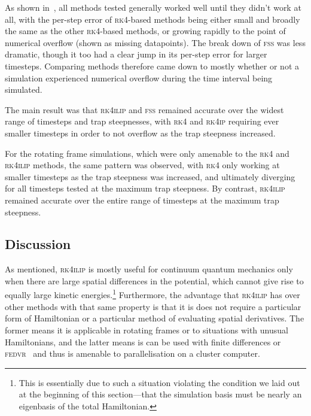 As shown in~, all methods tested generally worked well until they didn't work at all, with the per-step error of \textsc{rk4}-based methods being either small and broadly the same as the other \textsc{rk4}-based methods, or growing rapidly to the point of numerical overflow (shown as missing datapoints). The break down of \textsc{fss} was less dramatic, though it too had a clear jump in its per-step error for larger timesteps. Comparing methods therefore came down to mostly whether or not a simulation experienced numerical overflow during the time interval being simulated.

The main result was that \textsc{rk4ilip} and \textsc{fss} remained accurate over the widest range of timesteps and trap steepnesses, with \textsc{rk4} and \textsc{rk4ip} requiring ever smaller timesteps in order to not overflow as the trap steepness increased.

For the rotating frame simulations, which were only amenable to the \textsc{rk4} and \textsc{rk4ilip} methods, the same pattern was observed, with \textsc{rk4} only working at smaller timesteps as the trap steepness was increased, and ultimately diverging for all timesteps tested at the maximum trap steepness. By contrast, \textsc{rk4ilip} remained accurate over the entire range of timesteps at the maximum trap steepness.

\subsection{Discussion}

As mentioned, \textsc{rk4ilip} is mostly useful for continuum quantum mechanics only when there are large spatial differences in the potential, which cannot give rise to equally large kinetic energies.\footnote{This is essentially due to such a situation violating the condition we laid out at the beginning of this section---that the simulation basis must be nearly an eigenbasis of the total Hamiltonian.} Furthermore, the advantage that \textsc{rk4ilip} has over other methods with that same property is that it is does not require a particular form of Hamiltonian or a particular method of evaluating spatial derivatives. The former means it is applicable in rotating frames or to situations with unusual Hamiltonians, and the latter means is can be used with finite differences or \textsc{fedvr}~\cite{schneider_parallel_2006} and thus is amenable to parallelisation on a cluster computer.

